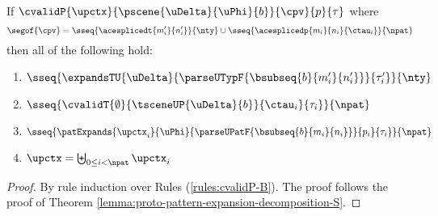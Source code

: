 \begin{lemma}
\label{lemma:proto-pattern-expansion-decomposition-B}
If $\cvalidP{\upctx}{\pscene{\uDelta}{\uPhi}{b}}{\cpv}{p}{\tau}$ where  
\[ 
\segof{\cpv} = \sseq{\acesplicedt{m'_i}{n'_i}}{\nty} \cup \sseq{\acesplicedp{m_i}{n_i}{\ctau_i}}{\npat}
\]
then all of the following hold:
\begin{enumerate}
    \item $\sseq{
          \expandsTU{\uDelta}
          {
            \parseUTypF{\bsubseq{b}{m'_i}{n'_i}}
          }{\tau'_i}
        }{\nty}$
    \item $\sseq{
      \cvalidT{\emptyset}{
        \tsceneUP
          {\uDelta}{b}
      }{
        \ctau_i
      }{\tau_i}
    }{\npat}$
    \item $\sseq{
      \patExpands
        {\upctx_i}
        {\uPhi}
        {\parseUPatF{\bsubseq{b}{m_i}{n_i}}}
        {p_i}
        {\tau_i}
    }{\npat}$
  \item $\upctx = \biguplus_{0 \leq i < \npat} \upctx_i$
\end{enumerate}
\end{lemma}
\begin{proof} By rule induction over Rules (\ref{rules:cvalidP-B}). The proof follows the proof of Theorem \ref{lemma:proto-pattern-expansion-decomposition-S}.
\end{proof}

